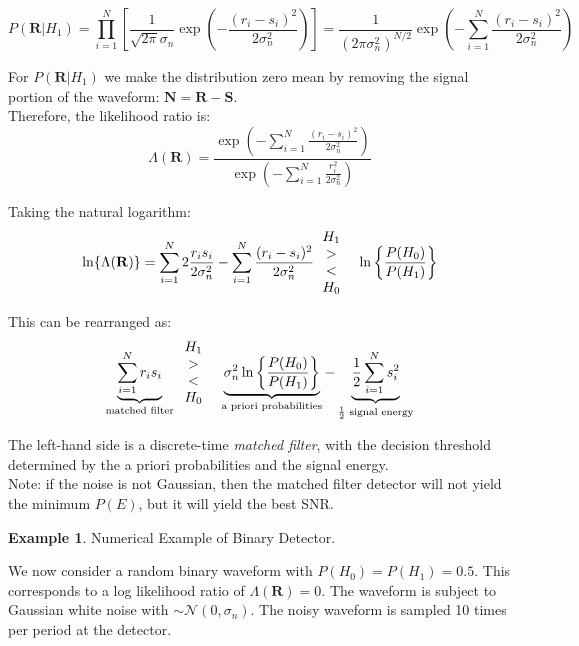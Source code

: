 \documentclass[12pt]{book}
\theoremstyle{definition}
\newtheorem{exmp}{Example}[chapter]
\begin{document}
\[
P(\mathbf{R}|H_1) = \prod_{i=1}^N \left [ \frac{1}{\sqrt{2 \pi} \sigma_n} \exp \left ({-\frac{(r_i-s_i)^2}{2 \sigma_n^2}} \right )\right] =  \frac{1}{(2 \pi \sigma^2_n)^{N/2}} \exp \left ({-\sum_{i=1}^N \frac{(r_i-s_i)^2}{2 \sigma_n^2}} \right )
\]

For \(P(\mathbf{R}|H_1)\) we make the distribution zero mean by removing the signal portion of the waveform: \(\mathbf{N=R-S}\). \\

Therefore, the likelihood ratio is:
\[
\Lambda(\mathbf{R}) = \frac{\exp \left ({-\sum_{i=1}^N \frac{(r_i-s_i)^2}{2 \sigma_n^2}} \right )}{\exp \left ({-\sum_{i=1}^N \frac{r_i^2}{2 \sigma_n^2}} \right )}  
\]

Taking the natural logarithm:
\[
\ln \{  \Lambda(\mathbf{R}) \} = \sum_{i=1}^N 2\frac{r_i s_i}{2 \sigma_n^2} - \sum_{i=1}^N \frac{(r_i-s_i)^2}{2 \sigma_n^2}  
\begin{tabular}{c @{\hspace{2\tabcolsep}} *{5}{c}}

     \(H_1\) \\
     $>$ \\
    $<$ \\
    \(H_0\)
\end{tabular}
\ln \left \{\frac{P(H_0)}{P(H_1)} \right \} 
\]

This can be rearranged as:
\[
\underbrace{\sum_{i=1}^N r_i s_i}_{\text{matched filter}}   
\begin{tabular}{c @{\hspace{2\tabcolsep}} *{5}{c}}

     \(H_1\) \\
     $>$ \\
    $<$ \\
    \(H_0\)
\end{tabular}
\underbrace{\sigma_n^2 \ln \left \{\frac{P(H_0)}{P(H_1)} \right \}}_{\text{a priori probabilities}}  - \underbrace{\frac{1}{2}\sum_{i=1}^N s_i^2}_{\frac{1}{2}\text{ signal energy}}
\]

The left-hand side is a discrete-time \emph{matched filter}, with the decision threshold determined by the a priori probabilities and the signal energy.\\

Note: if the noise is not Gaussian, then the matched filter detector will not yield the minimum \(P(E)\), but it will yield the best SNR. \\ 

\begin{tcolorbox}
\begin{exmp}{Numerical Example of Binary Detector.}

    We now consider a random binary waveform with \(P(H_0) = P(H_1) = 0.5\). This corresponds to a log likelihood ratio of \(\Lambda(\mathbf{R}) = 0\). The waveform is subject to Gaussian white noise with $\sim \mathcal{N} (0, \sigma_n)$. The noisy waveform is sampled 10 times per period at the detector.

    \end{exmp}
\end{tcolorbox}
\end{document}
